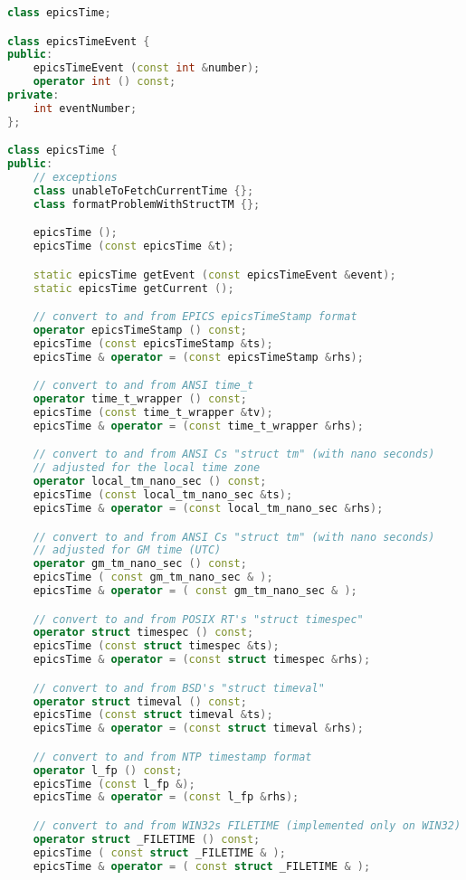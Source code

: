 \begin{lstlisting}[language=C++]
class epicsTime;

class epicsTimeEvent {
public:
    epicsTimeEvent (const int &number);
    operator int () const;
private:
    int eventNumber;
};

class epicsTime {
public:
    // exceptions
    class unableToFetchCurrentTime {};
    class formatProblemWithStructTM {};

    epicsTime ();
    epicsTime (const epicsTime &t);

    static epicsTime getEvent (const epicsTimeEvent &event);
    static epicsTime getCurrent ();

    // convert to and from EPICS epicsTimeStamp format
    operator epicsTimeStamp () const;
    epicsTime (const epicsTimeStamp &ts);
    epicsTime & operator = (const epicsTimeStamp &rhs);

    // convert to and from ANSI time_t 
    operator time_t_wrapper () const;
    epicsTime (const time_t_wrapper &tv);
    epicsTime & operator = (const time_t_wrapper &rhs);

    // convert to and from ANSI Cs "struct tm" (with nano seconds)
    // adjusted for the local time zone
    operator local_tm_nano_sec () const;
    epicsTime (const local_tm_nano_sec &ts);
    epicsTime & operator = (const local_tm_nano_sec &rhs);

    // convert to and from ANSI Cs "struct tm" (with nano seconds)
    // adjusted for GM time (UTC)
    operator gm_tm_nano_sec () const;
    epicsTime ( const gm_tm_nano_sec & );
    epicsTime & operator = ( const gm_tm_nano_sec & );

    // convert to and from POSIX RT's "struct timespec"
    operator struct timespec () const;
    epicsTime (const struct timespec &ts);
    epicsTime & operator = (const struct timespec &rhs);

    // convert to and from BSD's "struct timeval"
    operator struct timeval () const;
    epicsTime (const struct timeval &ts);
    epicsTime & operator = (const struct timeval &rhs);

    // convert to and from NTP timestamp format
    operator l_fp () const;
    epicsTime (const l_fp &);
    epicsTime & operator = (const l_fp &rhs);

    // convert to and from WIN32s FILETIME (implemented only on WIN32)
    operator struct _FILETIME () const;
    epicsTime ( const struct _FILETIME & );
    epicsTime & operator = ( const struct _FILETIME & );


\end{lstlisting}
